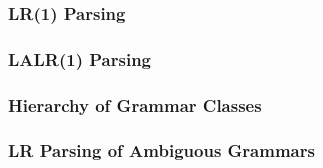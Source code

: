 \subsubsection{LR(1) Parsing}

\subsubsection{LALR(1) Parsing}

\subsubsection{Hierarchy of Grammar Classes}

\subsubsection{LR Parsing of Ambiguous Grammars}


